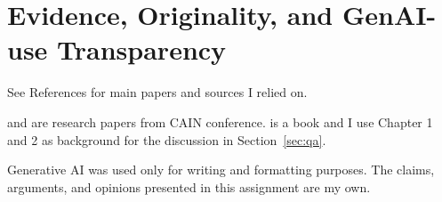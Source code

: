 \section{Evidence, Originality, and GenAI-use Transparency}

See References \cite{AlbertiniEtAl2026SCFC, kastner2025machine,ParthasarathyEtAl2025CloudOps} for main papers and sources I relied on.

\cite{AlbertiniEtAl2026SCFC} and \cite{ParthasarathyEtAl2025CloudOps} are research papers from CAIN conference. \cite{kastner2025machine} is a book and I use Chapter 1 and 2 as background for the discussion in Section~\ref{sec:qa}.

Generative AI was used only for writing and formatting purposes. The claims, arguments, and opinions presented in this assignment are my own.